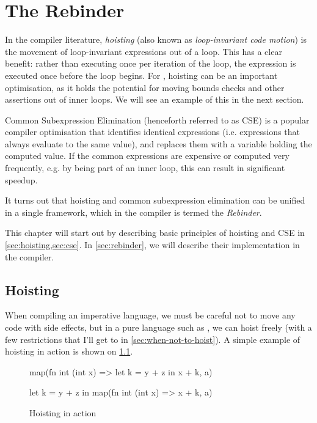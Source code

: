 \chapter{The Rebinder}
\label{chap:rebinder}

In the compiler literature, \textit{hoisting} (also known as
\textit{loop-invariant code motion}) is the movement of loop-invariant
expressions out of a loop.  This has a clear benefit: rather than
executing once per iteration of the loop, the expression is executed
once before the loop begins.  For \LO{}, hoisting can be an important
optimisation, as it holds the potential for moving bounds checks and
other assertions out of inner loops.  We will see an example of this
in the next section.

Common Subexpression Elimination (henceforth referred to as CSE) is a
popular compiler optimisation that identifies identical expressions
(i.e. expressions that always evaluate to the same value), and
replaces them with a variable holding the computed value.  If the
common expressions are expensive or computed very frequently, e.g. by
being part of an inner loop, this can result in significant speedup.

It turns out that hoisting and common subexpression elimination can be
unified in a single framework, which in the \LO{} compiler is termed
the \textit{Rebinder}.

This chapter will start out by describing basic principles of hoisting
and CSE in \cref{sec:hoisting,sec:cse}.  In \cref{sec:rebinder}, we
will describe their implementation in the \LO{} compiler.

\section{Hoisting}
\label{sec:hoisting}

When compiling an imperative language,
we must be careful not to move any code with side effects, but in a
pure language such as \LO{}, we can hoist freely (with a few
restrictions that I'll get to in \cref{sec:when-not-to-hoist}).  A
simple example of hoisting in action is shown on
\cref{fig:simple-hoisting}.

\begin{figure}
\begin{center}
\begin{bcolorcode}
map(fn int (int x) =>
      let k = y + z in
      x + k,
    a)
\end{bcolorcode}
\hspace{1cm}
%
\hspace{1cm}
\begin{bcolorcode}
let k = y + z in
map(fn int (int x) =>
      x + k,
    a)
\end{bcolorcode}
\end{center}

\caption{Hoisting in action}
\label{fig:simple-hoisting}
\end{figure}

